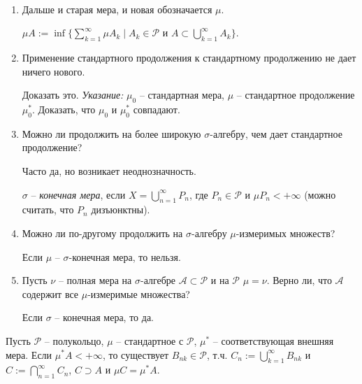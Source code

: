 \begin{remark}~
    \begin{enumerate}
        \item Дальше и старая мера, и новая обозначается $\mu$.
        
        $\mu A:=\inf \{\sum\limits_{k=1}^\infty \mu A_k\mid A_k\in \mathcal{P}\text{ и } A\subset \bigcup\limits_{k=1}^\infty A_k\}$.

        \item Применение стандартного продолжения к стандартному продолжению не дает ничего нового.

        \begin{exercise}
            Доказать это. \textit{Указание:} $\mu_0$ – стандартная мера, $\mu$ – стандартное продолжение $\mu_0^*$. 
            Доказать, что $\mu_0$ и $\mu_0^*$ совпадают.
        \end{exercise}
        
        \item Можно ли продолжить на более широкую $\sigma$-алгебру, чем дает стандартное продолжение?
        
        Часто да, но возникает неоднозначность.
        
        \begin{definition}
            $\sigma$ – \textit{конечная мера}, если $X=\bigcup\limits_{n=1}^\infty P_n$, где $P_n\in \mathcal{P}$ и 
            $\mu P_n <+\infty$ (можно считать, что $P_n$ дизъюнктны).
        \end{definition}
        
        \item Можно ли по-другому продолжить на $\sigma$-алгебру $\mu$-измеримых множеств?
        
        Если $\mu$ – $\sigma$-конечная мера, то нельзя.

        \item Пусть $\nu$ – полная мера на $\sigma$-алгебре $\mathcal{A}\subset \mathcal{P}$ и на $\mathcal{P}$ $\mu=\nu$.
        Верно ли, что $\mathcal{A}$ содержит все $\mu$-измеримые множества? 
        
        Если $\sigma$ – конечная мера, то да.
    \end{enumerate}
\end{remark}

\begin{theorem}
    Пусть $\mathcal{P}$ – полукольцо, $\mu$ – стандартное с $\mathcal{P}$, $\mu^*$ – соответствующая внешняя мера.
    Если $\mu^* A<+\infty$, то существует $B_{nk}\in \mathcal{P}$, т.ч. $C_n:=\bigcup\limits_{k=1}^\infty B_{nk}$ и 
    $C:=\bigcap\limits_{n=1}^\infty C_n$, $C\supset A$ и $\mu C=\mu^* A$.
\end{theorem}

